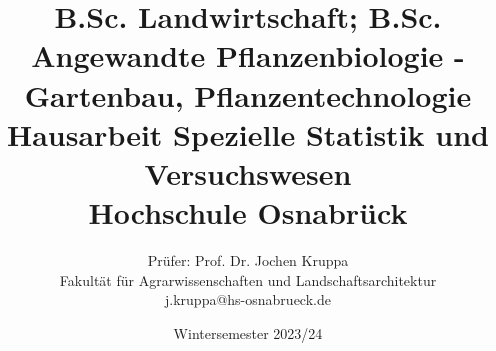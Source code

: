 \setlength{\parindent}{0cm}
\usepackage{booktabs}
\usepackage{amsmath}
\usepackage[normalem]{ulem}
\renewcommand{\familydefault}{\sfdefault}

\def\examdate{Wintersemester 2023/24}
\def\exammodule{B.Sc. Landwirtschaft; B.Sc. Angewandte Pflanzenbiologie - Gartenbau, Pflanzentechnologie}
\def\lecture{Spezielle Statistik und Versuchswesen}
\def\examtitle{Hausarbeit \lecture}

\title{
\large \exammodule \\[5Ex]
\Huge \examtitle \\[2Ex] 
\Large Hochschule Osnabr{\"u}ck
}
\author{Pr{\"u}fer: Prof. Dr. Jochen Kruppa \\
Fakult{\"a}t f{\"u}r Agrarwissenschaften und Landschaftsarchitektur \\ 
j.kruppa@hs-osnabrueck.de}
\date{\examdate}